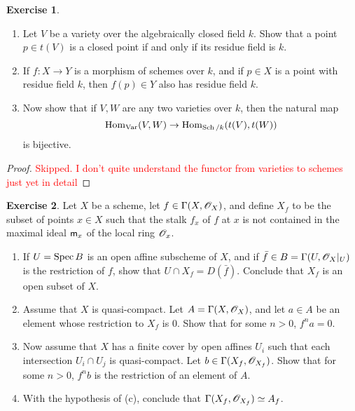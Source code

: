 \documentclass[]{pcmi}
\theoremstyle{plain}
\theoremstyle{definition}
\newtheorem{Exercise}{Exercise}
\theoremstyle{remark}
\begin{document}
\begin{Exercise}
    \phantom{h}
    \begin{enumerate}[label = (\alph*)]
        \item Let $V$ be a variety over the algebraically closed field $k$. Show that a point $p \in t(V)$ is a closed point if and only if its residue field is $k$. 
        \item If $f : X \to Y$ is a morphism of schemes over $k$, and if $p \in X$ is a point with residue field $k$, then $f(p) \in Y$ also has residue field $k$. 
        \item Now show that if $V, W$ are any two varieties over $k$, then the natural map 
        \[
            \operatorname{Hom}_{\operatorname{Var}}(V, W) \to \operatorname{Hom}_{\operatorname{Sch} / k} (t(V), t(W))
        \]
        is bijective. 
    \end{enumerate}
\end{Exercise}
\begin{proof}
    \textcolor{red}{Skipped. I don't quite understand the functor from varieties to schemes just yet in detail}
\end{proof}
\begin{Exercise}
    Let $X$ be a scheme, let $f \in \Gamma(X, \mathscr{O}_X)$, and define $X_f$ to be the subset of points $x \in X$ such that the stalk $f_x$ of $f$ at $x$ is not contained in the maximal ideal $\mathsf{m}_x$ of the local ring $\mathscr{O}_x$. 
    \begin{enumerate}[label = (\alph*)]
        \item If $U = \operatorname{Spec} B$ is an open affine subscheme of $X$, and if $\bar{f} \in B = \Gamma(U, \mathscr{O}_X|_U)$ is the restriction of $f$, show that $U \cap X_f = D(\bar{f})$. Conclude that $X_f$ is an open subset of $X$. 
        \item Assume that $X$ is quasi-compact. Let $A = \Gamma(X, \mathscr{O}_X)$, and let $a \in A$ be an element whose restriction to $X_f$ is $0$. Show that for some $n > 0$, $f^n a = 0$. 
        \item Now assume that $X$ has a finite cover by open affines $U_i$ such that each intersection $U_i \cap U_j$ is quasi-compact. Let $b \in \Gamma(X_f, \mathscr{O}_{X_f})$. Show that for some $n > 0$, $f^nb$ is the restriction of an element of $A$. 

        \item With the hypothesis of (c), conclude that $\Gamma(X_f, \mathscr{O}_{X_f}) \simeq A_f$. 
    \end{enumerate}
\end{Exercise}
\end{document}
